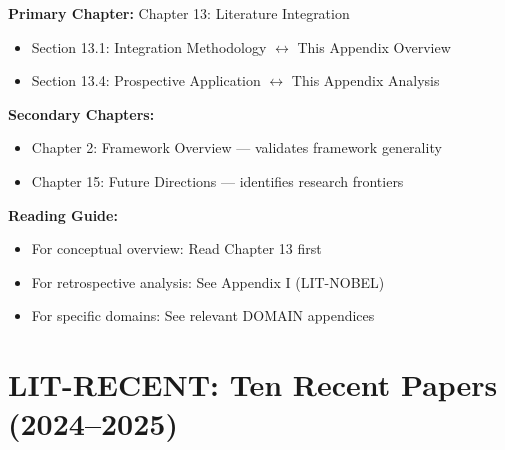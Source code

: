 \begin{tcolorbox}[colback=purple!5!white, colframe=purple!75!black,
    title=Chapter Linkage]

\textbf{Primary Chapter:} Chapter 13: Literature Integration
\begin{itemize}[nosep]
\item Section 13.1: Integration Methodology $\leftrightarrow$ This Appendix Overview
\item Section 13.4: Prospective Application $\leftrightarrow$ This Appendix Analysis
\end{itemize}

\textbf{Secondary Chapters:}
\begin{itemize}[nosep]
\item Chapter 2: Framework Overview --- validates framework generality
\item Chapter 15: Future Directions --- identifies research frontiers
\end{itemize}

\textbf{Reading Guide:}
\begin{itemize}[nosep]
\item For conceptual overview: Read Chapter 13 first
\item For retrospective analysis: See Appendix I (LIT-NOBEL)
\item For specific domains: See relevant DOMAIN appendices
\end{itemize}

\end{tcolorbox}

\chapter{LIT-RECENT: Ten Recent Papers (2024--2025)}
\label{app:recentpapers}

\begin{abstract}
This appendix demonstrates the EBF framework's \emph{prospective} application
by analyzing ten papers published in 2024--2025. Unlike the Nobel retrospective
(Appendix I), these papers were published \emph{after} the framework was
conceived. This tests the claim that any new economics paper can be
characterized in terms of $(C, \Psi, C^*, K, Q)$. All ten papers map
successfully, with complementarities ($C^{SS}$, $C^{market}$, $C^{F,Political}$),
context dimensions ($\Psi_{neighborhood}$, $\Psi_{policy}$, $\Psi_{inst}$),
and all FEPSDE welfare dimensions appearing across the sample.
\end{abstract}

